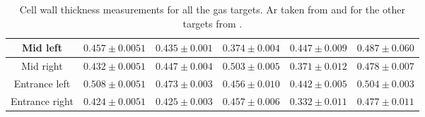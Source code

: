 \documentclass[final,5p,times,twocolumn,balance]{elsarticle}
\begin{document}
\begin{table}[!h]
\begin{adjustbox}{width=1\textwidth}
\begin{tabular}{|c|c|c|c|c|c|}
Mid left             &        $0.457 \pm 0.0051$                                                  & $0.435 \pm 0.001$                                                     & $0.374 \pm 0.004$                                                     & $0.447 \pm 0.009$                                                     & $0.487 \pm 0.060$                                                      \\ \hline
Mid right             &        $0.432 \pm 0.0051$                                                  & $0.447 \pm 0.004$                                                     & $0.503 \pm 0.005$                                                     & $0.371 \pm 0.012$                                                     & $0.478 \pm 0.007$                                                    \\ \hline
Entrance left      &          $0.508 \pm 0.0051$                                                  & $0.473 \pm 0.003$                                                     & $0.456 \pm 0.010$                                                     & $0.442 \pm 0.005$                                                     & $0.504 \pm 0.003$                                                      \\ \hline
Entrance right     &		 $0.424 \pm 0.0051$                             & $0.425 \pm 0.003$                                & 
$0.457 \pm 0.006$                                & 
$0.332 \pm 0.011$                                & 
$0.477 \pm 0.011$                                 \\ \hline
\end{tabular}
\end{adjustbox}
\caption{Cell wall thickness measurements for all the gas targets. Ar taken from \cite{ar_config} and for the other targets from \cite{cellconfig}.}
\label{tab:cell}
\end{table}
\end{document}
